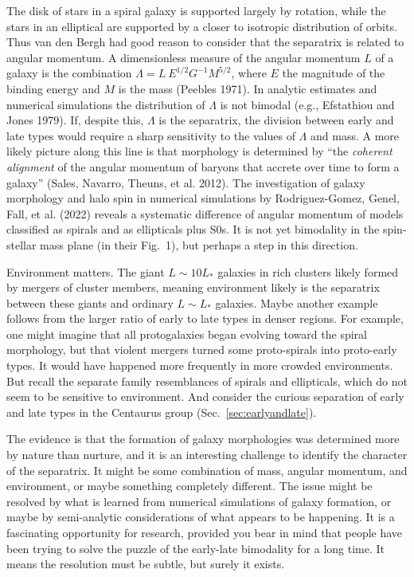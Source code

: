 \documentclass[fleqn,12pt]{article}
\begin{document}
The disk of stars in a spiral galaxy is supported largely by rotation, while the stars in an elliptical are supported by a closer to isotropic distribution of orbits. Thus van den Bergh had good reason to consider that the separatrix is related to angular momentum. A dimensionless measure of the angular momentum $L$ of a galaxy is the combination $\Lambda = L~E^{1/2}G^{-1}M^{5/2}$, where $E$ the magnitude of the binding energy and $M$ is the mass (Peebles 1971). In analytic estimates and numerical simulations the distribution of $\Lambda$ is not bimodal (e.g., Efstathiou and Jones 1979). If, despite this, $\Lambda$ is the separatrix, the division between early and late types would require a sharp sensitivity to the values of $\Lambda$ and mass. A more likely picture along this line is that morphology is determined by ``the {\it coherent alignment} of the angular momentum of baryons that accrete over time to form a galaxy'' (Sales, Navarro, Theuns, et al. 2012). The investigation of galaxy morphology and halo spin in numerical simulations by Rodriguez-Gomez, Genel, Fall, et al. (2022) reveals a systematic difference of angular momentum of models classified as spirals and as ellipticals plus S0s. It is not yet bimodality in the spin-stellar mass plane (in their Fig.~1), but perhaps a step in this direction.

Environment matters. The giant $L\sim 10L_\ast$ galaxies in rich clusters likely formed by mergers of cluster members, meaning environment likely is the separatrix between these giants and ordinary $L\sim L_\ast$ galaxies. Maybe another example follows from the larger ratio of early to late types  in denser regions. For example, one might imagine that all protogalaxies began evolving toward the spiral morphology, but that violent mergers turned some proto-spirals into proto-early types. It would have happened more frequently in more crowded environments. But recall the separate family resemblances of spirals and ellipticals, which do not seem to be sensitive to environment. And consider the curious separation of early and late types in the Centaurus group (Sec.~\ref{sec:earlyandlate}).

The evidence is that the formation of galaxy morphologies was determined more by nature than nurture, and it is an interesting challenge to identify the character of the  separatrix. It might be some combination of mass, angular momentum, and environment, or maybe something completely different. The issue might be resolved by what is learned from numerical simulations of galaxy formation, or maybe by semi-analytic considerations of what appears to be happening. It is a fascinating opportunity for research, provided you bear in mind that people have been trying to solve the puzzle of the early-late bimodality for a long time. It means the resolution must be subtle, but surely it exists.
\end{document}
